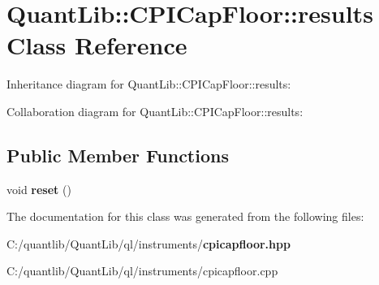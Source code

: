 \section{Quant\+Lib\+:\+:C\+P\+I\+Cap\+Floor\+:\+:results Class Reference}
\label{class_quant_lib_1_1_c_p_i_cap_floor_1_1results}


Inheritance diagram for Quant\+Lib\+:\+:C\+P\+I\+Cap\+Floor\+:\+:results\+:


Collaboration diagram for Quant\+Lib\+:\+:C\+P\+I\+Cap\+Floor\+:\+:results\+:
\subsection*{Public Member Functions}
\begin{DoxyCompactItemize}
\item 
void {\bfseries reset} ()\label{class_quant_lib_1_1_c_p_i_cap_floor_1_1results_ac880c185a93fd2f5178e6365748e42d6}

\end{DoxyCompactItemize}


The documentation for this class was generated from the following files\+:\begin{DoxyCompactItemize}
\item 
C\+:/quantlib/\+Quant\+Lib/ql/instruments/{\bf cpicapfloor.\+hpp}\item 
C\+:/quantlib/\+Quant\+Lib/ql/instruments/cpicapfloor.\+cpp\end{DoxyCompactItemize}
